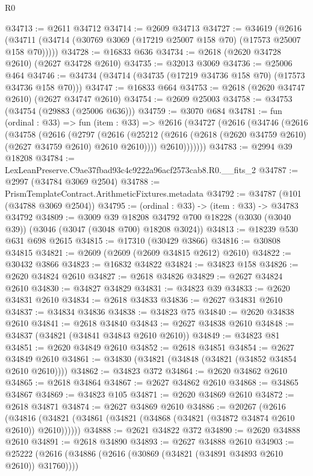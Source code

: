 \begin{lexlean}{R0}
\begin{coremodule}
@34713 := @2611 @34712
@34714 := @2609 @34713
@34727 := @34619
    (@2616 (@34711 (@34714 (@30769 @3069 (@17219 @25007 @158 @70) (@17573 @25007 @158 @70)))))
@34728 := @16833 @636
@34734 := @2618 (@2620 @34728 @2610) (@2627 @34728 @2610)
@34735 := @32013 @3069
@34736 := @25006 @464
@34746 := @34734 (@34714 (@34735 (@17219 @34736 @158 @70) (@17573 @34736 @158 @70)))
@34747 := @16833 @664
@34753 := @2618 (@2620 @34747 @2610) (@2627 @34747 @2610)
@34754 := @2609 @25003
@34758 := @34753 (@34754 (@29883 (@25006 @636)))
@34759 := @3070 @684
@34781 := fun (ordinal : @33) =>
  fun (item : @33) =>
  @2616
    (@34727
      (@2616
        (@34746
          (@2616
            (@34758
              (@2616
                (@2797
                  (@2616
                    (@25212 (@2616 (@2618 (@2620 @34759 @2610) (@2627 @34759 @2610) @2610 @2610))))
                  @2610)))))))
@34783 := @2994 @39 @18208
@34784 := LexLeanPreserve.C9ae37fbad93c4c9222a96acf2573cab8.R0.__fits_2
@34787 := @2997 (@34784 @3069 @2504)
@34788 := PrismTemplateContract.ArithmeticFixtures.metadata
@34792 := @34787 (@101 (@34788 @3069 @2504))
@34795 := (ordinal : @33) -> (item : @33) -> @34783 @34792
@34809 := @3009
    @39
    @18208
    @34792
    @700
    @18228
    (@3030 (@3040 @39))
    (@3046 (@3047 (@3048 @700) @18208 @3024))
@34813 := @18239 @530 @631 @698 @2615
@34815 := @17310 (@30429 @3866)
@34816 := @30808 @34815
@34821 := @2609 (@2609 (@2609 @34815 @2612) @2610)
@34822 := @30432 @3866
@34823 := @16832 @34822
@34824 := @34823 @158
@34826 := @2620 @34824 @2610
@34827 := @2618 @34826
@34829 := @2627 @34824 @2610
@34830 := @34827 @34829
@34831 := @34823 @39
@34833 := @2620 @34831 @2610
@34834 := @2618 @34833
@34836 := @2627 @34831 @2610
@34837 := @34834 @34836
@34838 := @34823 @75
@34840 := @2620 @34838 @2610
@34841 := @2618 @34840
@34843 := @2627 @34838 @2610
@34848 := @34837 (@34821 (@34841 @34843 @2610 @2610))
@34849 := @34823 @81
@34851 := @2620 @34849 @2610
@34852 := @2618 @34851
@34854 := @2627 @34849 @2610
@34861 := @34830 (@34821 (@34848 (@34821 (@34852 @34854 @2610 @2610))))
@34862 := @34823 @372
@34864 := @2620 @34862 @2610
@34865 := @2618 @34864
@34867 := @2627 @34862 @2610
@34868 := @34865 @34867
@34869 := @34823 @105
@34871 := @2620 @34869 @2610
@34872 := @2618 @34871
@34874 := @2627 @34869 @2610
@34886 := @20267
    (@2616 (@34816 (@34821 (@34861 (@34821 (@34868 (@34821 (@34872 @34874 @2610 @2610)) @2610))))))
@34888 := @2621 @34822 @372
@34890 := @2620 @34888 @2610
@34891 := @2618 @34890
@34893 := @2627 @34888 @2610
@34903 := @25222 (@2616 (@34886 (@2616 (@30869 (@34821 (@34891 @34893 @2610 @2610)) @31760))))

\end{coremodule}
\end{lexlean}
